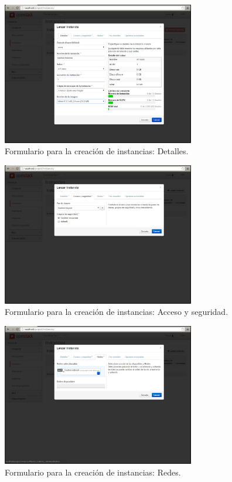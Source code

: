 \documentclass{article}
\begin{document}
\begin{figure}[h]
  \centering
    \includegraphics[width=0.75\textwidth]{img/m_038.png}
  \caption{Formulario para la creación de instancias: Detalles.}
  \label{fig:InstanceCreateFormDetails}
\end{figure}	

\begin{figure}[h]
  \centering
    \includegraphics[width=0.75\textwidth]{img/m_039.png}
  \caption{Formulario para la creación de instancias: Acceso y seguridad.}
  \label{fig:InstanceCreateFormSecurityGroup}
\end{figure}	

\begin{figure}[h]
  \centering
    \includegraphics[width=0.75\textwidth]{img/m_040.png}
  \caption{Formulario para la creación de instancias: Redes.}
  \label{fig:InstanceCreateFormNetwork}
\end{figure}	
\end{document}
